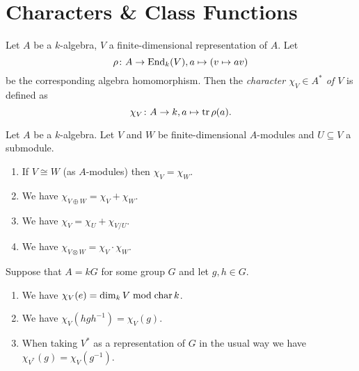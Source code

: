 \section{Characters \& Class Functions}


\begin{defi}
  Let $A$ be a $k$-algebra, $V$ a finite-dimensional representation of $A$.
  Let
  \[
            \rho
    \colon  A
    \to     \operatorname{End}_k(V),
            a
    \mapsto (v \mapsto av)
  \]
  be the corresponding algebra homomorphism.
  Then the \emph{character $\chi_V \in A^*$ of $V$} is defined as
  \[
            \chi_V
    \colon  A
    \to     k,
            a
    \mapsto \operatorname{tr} \rho(a).
  \]
\end{defi}


\begin{prop}\label{prop: properties characters}
  Let $A$ be a $k$-algebra.
  Let $V$ and $W$ be finite-dimensional $A$-modules and $U \subseteq V$ a submodule.
  \begin{enumerate}[label=\emph{\alph*)},leftmargin=*]
    \item
      If $V \cong W$ (as $A$-modules) then $\chi_V = \chi_W$.
    \item
      We have $\chi_{V \oplus W} = \chi_V + \chi_W$.
    \item
      We have $\chi_V = \chi_U + \chi_{V/U}$.
    \item
      We have $\chi_{V \otimes W} = \chi_V \cdot \chi_W$.
  \end{enumerate}
  Suppose that $A = kG$ for some group $G$ and let $g,h \in G$.
  \begin{enumerate}[label=\emph{\alph*)},leftmargin=*,resume]
    \item
      We have $\chi_V(e) = \dim_k V \bmod \operatorname{char} k$.
    \item
      We have $\chi_V(hgh^{-1}) = \chi_V(g)$.
    \item
      When taking $V^*$ as a representation of $G$ in the usual way we have $\chi_{V^*}(g) = \chi_V(g^{-1})$.
  \end{enumerate}
\end{prop}
